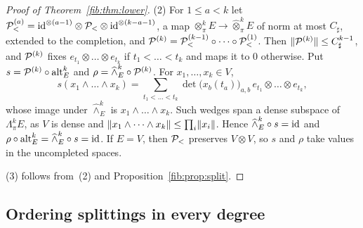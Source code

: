\begin{proof}[Proof of Theorem~\ref{fib:thm:lower}]
(2) For $1\le a<k$ let $\mathcal P_<^{(a)}=\mathrm{id}^{\otimes(a-1)}\otimes\mathcal P_<\otimes\mathrm{id}^{\otimes(k-a-1)}$, a map
$\otimes^k_\pi E\to\widehat\otimes^k_\pi E$ of norm at most $C_\sharp$, extended to the completion, and
$\mathcal P^{(k)}=\mathcal P_<^{(k-1)}\circ\dots\circ\mathcal P_<^{(1)}$. Then $\lVert \mathcal P^{(k)}\rVert\le C_\sharp^{k-1}$, and $\mathcal P^{(k)}$ fixes
$e_{t_1}\otimes\dots\otimes e_{t_k}$ if $t_1<\dots<t_k$ and maps it to $0$ otherwise. Put
$s=\mathcal P^{(k)}\circ\operatorname{alt}^k_E$ and $\rho=\widehat\wedge^k_E\circ\mathcal P^{(k)}$. For $x_1,\dots,x_k\in V$,
\[
 s(x_1\wedge\dots\wedge x_k)=\sum_{t_1<\dots<t_k}\det\bigl(x_b(t_a)\bigr)_{a,b}\,e_{t_1}\otimes\dots\otimes e_{t_k},
\]
whose image under $\widehat\wedge^k_E$ is $x_1\wedge\dots\wedge x_k$. Such wedges span a dense subspace of
$\Lambda^k_\pi E$, as $V$ is dense and $\lVert x_1\wedge\dots\wedge x_k\rVert\le\prod_i\lVert x_i\rVert$. Hence
$\widehat\wedge^k_E\circ s=\mathrm{id}$ and $\rho\circ\operatorname{alt}^k_E=\widehat\wedge^k_E\circ s=\mathrm{id}$. If $E=V$, then
$\mathcal P_<$ preserves $V\otimes V$, so $s$ and $\rho$ take values in the uncompleted spaces.

(3) follows from~(2) and Proposition~\ref{fib:prop:split}.
\end{proof}

\subsection{Ordering splittings in every degree}\label{ord:ssec:ordering}

